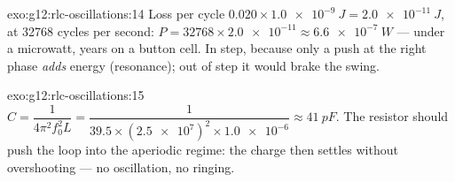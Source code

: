 \begin{solution}{exo:g12:rlc-oscillations:14}
Loss per cycle $0.020 \times \qty{1.0e-9}{J} = \qty{2.0e-11}{J}$, at
\num{32768} cycles per second: $P = \num{32768} \times \num{2.0e-11}
\approx \qty{6.6e-7}{W}$ --- under a microwatt, years on a button
cell. In step, because only a push at the right phase \emph{adds}
energy (resonance); out of step it would brake the swing.
\end{solution}

\begin{solution}{exo:g12:rlc-oscillations:15}
$C = \dfrac{1}{4\pi^2 f_0^2 L} = \dfrac{1}{39.5 \times
(\num{2.5e7})^2 \times \num{1.0e-6}} \approx \qty{41}{pF}$. The
resistor should push the loop into the aperiodic regime: the charge
then settles without overshooting --- no oscillation, no ringing.
\end{solution}


